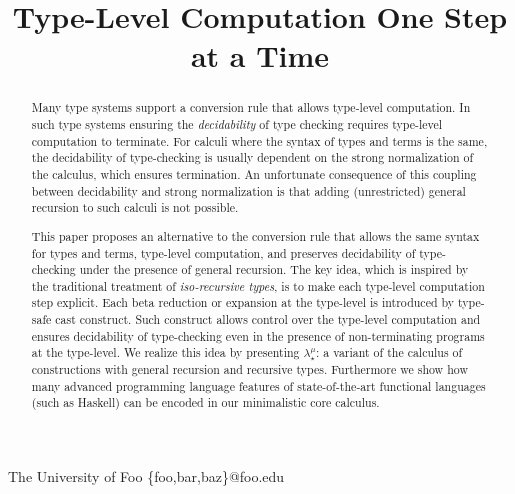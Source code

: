 \documentclass[preprint,nocopyrightspace]{sigplanconf}
\newcommand{\name}{{\bf $\lambda_{\star}^{\mu}$}\xspace}
\begin{document}


\preprintfooter{} %

\title{Type-Level Computation One Step at a Time}

           {The University of Foo}
           {\{foo,bar,baz\}@foo.edu}

\maketitle

\begin{abstract}
Many type systems support a conversion rule that allows type-level
computation. In such type systems ensuring the \emph{decidability} of
type checking requires type-level computation to terminate.
For calculi where the syntax of types and terms is the same, the
decidability of type-checking is usually dependent on the strong normalization
of the calculus, which ensures termination. An unfortunate
consequence of this coupling between decidability and strong
normalization is that adding (unrestricted) general recursion to such
calculi is not possible.

This paper proposes an alternative to the conversion rule that allows
the same syntax for types and terms, type-level computation, and
preserves decidability of type-checking under the presence of general
recursion. The key idea, which is inspired by the traditional
treatment of \emph{iso-recursive types}, is to make each type-level
computation step explicit. Each beta reduction or expansion at the
type-level is introduced by type-safe cast construct. Such construct allows control
over the type-level computation and ensures decidability of
type-checking even in the presence of non-terminating programs at the
type-level.  We realize this idea by presenting \name: a variant of the
calculus of constructions with general recursion and recursive types.
Furthermore we show how many advanced programming language features of
state-of-the-art functional languages (such as Haskell) can be encoded
in our minimalistic core calculus.
\end{abstract}
\end{document}
